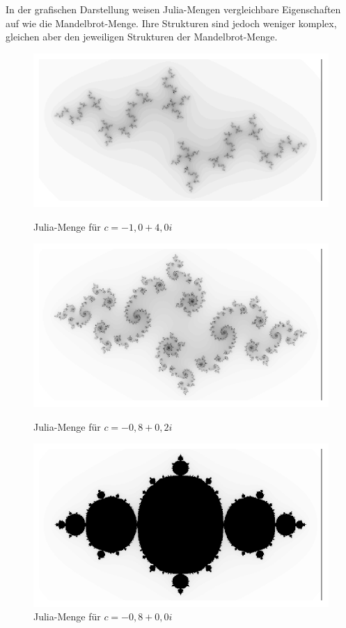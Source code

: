 \noindent
In der grafischen Darstellung weisen Julia-Mengen vergleichbare Eigenschaften
auf wie die Mandelbrot-Menge. Ihre Strukturen sind jedoch weniger komplex,
gleichen aber den jeweiligen Strukturen der Mandelbrot-Menge.

\hfill \break
\newline

\begin{figure}[!htb]
  \includegraphics[width=\linewidth]{img/Julia -1.0+0.4i.pdf}
  \caption{\newline Julia-Menge für \newline $c=-1,0+4,0i$}\label{fig:julia-menge-1}
  \endminipage\hfill
  \includegraphics[width=\linewidth]{img/Julia -0.8+0.2i.pdf}
  \caption{\newline Julia-Menge für \newline  $c = -0,8 + 0,2i$}\label{fig:julia-menge-2}
  \endminipage\hfill
  \includegraphics[width=\linewidth]{img/Julia -0.8+0.0i.pdf}
  \caption{\newline Julia-Menge für \newline  $c = -0,8 + 0,0i$}\label{fig:julia-menge-3}
  \endminipage
\end{figure}
